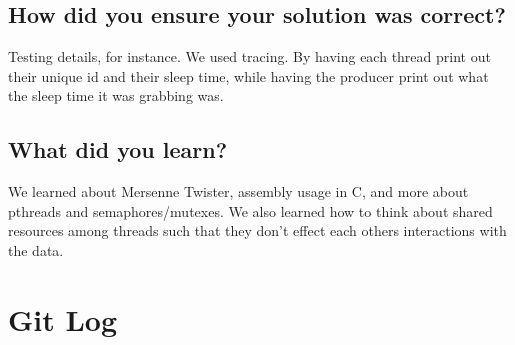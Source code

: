 \documentclass[onecolumn, draftclsnofoot,10pt, compsoc]{IEEEtran}
\begin{document}
\subsection{How did you ensure your solution was correct?}

Testing details, for instance.
We used tracing. By having each thread print out their unique id and their sleep time, while having the producer print out what the sleep time it was grabbing was.

\subsection{What did you learn?}

We learned about Mersenne Twister, assembly usage in C, and more about pthreads and semaphores/mutexes.  We also learned how to think about shared resources among threads such that they don't effect each others interactions with the data.


\section{Git Log}
\end{document}
